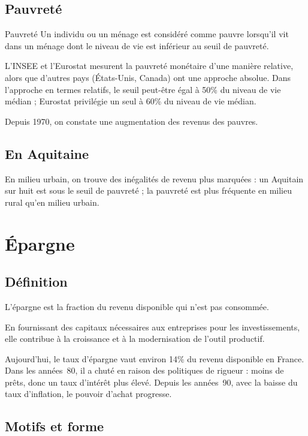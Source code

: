 \documentclass[10pt,a4paper,french]{article}
\begin{document}
\subsection{Pauvreté}

\begin{cquote}{Pauvreté}
Un individu ou un ménage est considéré comme pauvre lorsqu'il vit dans un ménage dont le niveau de vie est inférieur au seuil de pauvreté.
\end{cquote}

L'INSEE et l'Eurostat mesurent la pauvreté monétaire d'une manière relative, alors que d'autres pays (États-Unis, Canada) ont une approche absolue. Dans l'approche en termes relatifs, le seuil peut-être égal à 50\% du niveau de vie médian ; Eurostat privilégie un seul à 60\% du niveau de vie médian.

Depuis 1970, on constate une augmentation des revenus des pauvres.

\subsection{En Aquitaine}

En milieu urbain, on trouve des inégalités de revenu plus marquées : un Aquitain sur huit est sous le seuil de pauvreté ; la pauvreté est plus fréquente en milieu rural qu'en milieu urbain.

\section{Épargne}

\subsection{Définition}

L'épargne est la fraction du revenu disponible qui n'est pas consommée.

En fournissant des capitaux nécessaires aux entreprises pour les investissements, elle contribue à la croissance et à la modernisation de l'outil productif.

Aujourd'hui, le taux d'épargne vaut environ 14\% du revenu disponible en France. Dans les années~80, il a chuté en raison des politiques de rigueur : moins de prêts, donc un taux d'intérêt plus élevé. Depuis les
années~90, avec la baisse du taux d'inflation, le pouvoir d'achat progresse.

\subsection{Motifs et forme}
\end{document}
